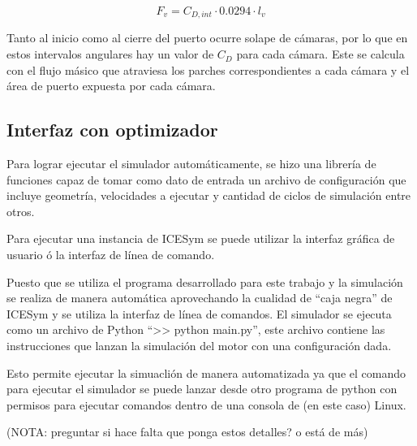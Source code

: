 \begin{equation}\label{eq:fv}
    F_v = C_{D,int}\cdot 0.0294\cdot l_{v}
\end{equation}


Tanto al inicio como al cierre del puerto ocurre solape de cámaras, por lo que
en estos intervalos angulares hay un valor de $C_D$ para cada cámara.
%
Este se calcula con el flujo másico que atraviesa los parches correspondientes
a cada cámara y el área de puerto expuesta por cada cámara.

\subsection{Interfaz con optimizador}
%
Para lograr ejecutar el simulador automáticamente, se hizo una librería de
funciones capaz de tomar como dato de entrada un archivo de configuración que
incluye geometría, velocidades a ejecutar y cantidad de ciclos de simulación
entre otros.

Para ejecutar una instancia de ICESym se puede utilizar la interfaz gráfica de usuario ó la interfaz de línea de comando.



Puesto que se utiliza el programa desarrollado para este trabajo y la simulación
se realiza de manera automática aprovechando la cualidad de ``caja negra'' de
ICESym y se utiliza la interfaz de línea de comandos.
%
El simulador se ejecuta como un archivo de Python ``>> python main.py'', este
archivo contiene las instrucciones que lanzan la simulación del motor con
una configuración dada.
%

Esto permite ejecutar la simuaclión de manera automatizada ya que el comando
para ejecutar el simulador se puede lanzar desde otro programa de python con
permisos para ejecutar comandos dentro de una consola de (en este caso) Linux.

(NOTA: preguntar si hace falta que ponga estos detalles? o está de más)
